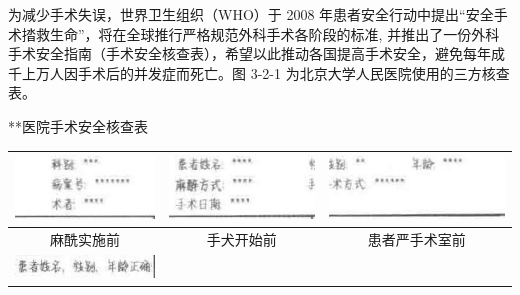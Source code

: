 \documentclass[10pt]{article}
\begin{document}
为减少手术失误，世界卫生组织（WHO）于 2008 年患者安全行动中提出“安全手术㧺救生命”，将在全球推行严格规范外科手术各阶段的标准, 并推出了一份外科手术安全指南（手术安全核查表），希望以此推动各国提高手术安全，避免每年成千上万人因手术后的并发症而死亡。图 3-2-1 为北京大学人民医院使用的三方核查表。

**医院手术安全核查表

\begin{center}
\begin{tabular}{|c|c|c|}
\hline
\includegraphics[max width=\textwidth]{2024_07_05_645bb794a4d4f32ee0c8g-080(7)}
 & \includegraphics[max width=\textwidth]{2024_07_05_645bb794a4d4f32ee0c8g-080(15)}
 & \includegraphics[max width=\textwidth]{2024_07_05_645bb794a4d4f32ee0c8g-080(36)}
 \\
\hline
麻酰实施前 & 手犬开始前 & 患者严手术室前 \\
\hline
\includegraphics[max width=\textwidth]{2024_07_05_645bb794a4d4f32ee0c8g-080(1)}

\end{tabular}
\end{center}
\end{document}
